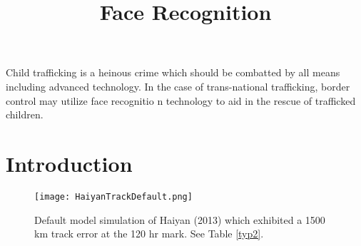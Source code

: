 \documentclass{SBCbookchapter}
\title{Face Recognition}
\begin{document}
\maketitle



\vspace{.3in}
\begin{minipage}[r]{4.25in}{\small
  Child trafficking is a heinous crime which should be combatted by all means including advanced technology.  In the case of trans-national
  trafficking, border control may utilize face recognitio n technology to aid in the rescue of trafficked children.

\newpage

\section{Introduction}


\begin{figure}[h]
\hspace{1.2in} \texttt{[image: HaiyanTrackDefault.png]}
 \caption{Default model simulation of Haiyan (2013) which exhibited a 1500 km track error at the 120 hr mark. See Table \ref{typ2}. }
 \centering
 \label{haiyanbasic}
\end{figure}


}
\end{minipage}
\end{document}
